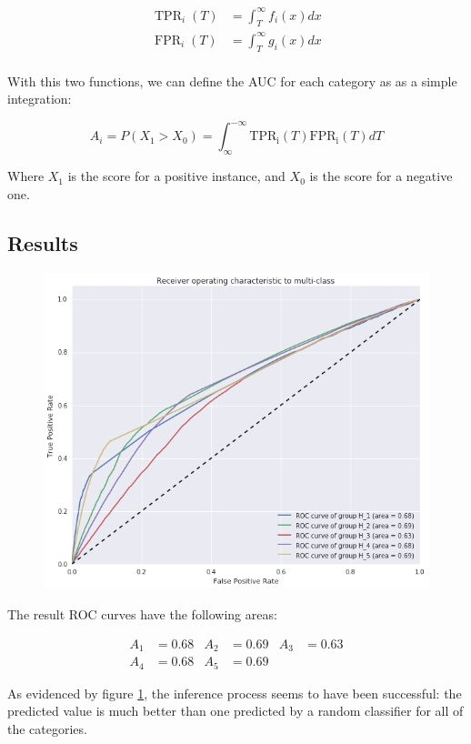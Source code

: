 \vspace{-1em}

\begin{align*}
\operatorname{TPR}_i(T) &= \int^{\infty}_T f_i(x) dx \\
\operatorname{FPR}_i(T) &= \int^{\infty}_T g_i(x) dx \\
\end{align*}

\vspace{-1.5em}

With this two functions, we can define the AUC for each category as as a simple integration:

\[
A_i = P(X_1 > X_0) = \int^{-\infty}_{\infty} \operatorname{TPR_i}(T) \operatorname{FPR_i}(T) dT
\]

Where $ X_1 $ is the score for a positive instance, and $ X_0 $ is the score for a negative one.

\subsection{Results}

\begin{figure}[H]
\begin{center}
\includegraphics[width=\columnwidth]{figures/ROC_multiclass/ROC_multiclass.png}
\caption{ \protect}
\label{ROC_multiclass}
\end{center}
\end{figure}

The result ROC curves have the following areas:

\vspace{-1em}

\begin{align*}
A_1 &= 0.68 & A_2 &= 0.69 & A_3 &= 0.63 \\ 
A_4 &= 0.68 & A_5 &= 0.69
\end{align*}

As evidenced by figure \ref{ROC_multiclass}, the inference process seems to have been successful: the predicted value is much better than one predicted by a random classifier for all of the categories.
